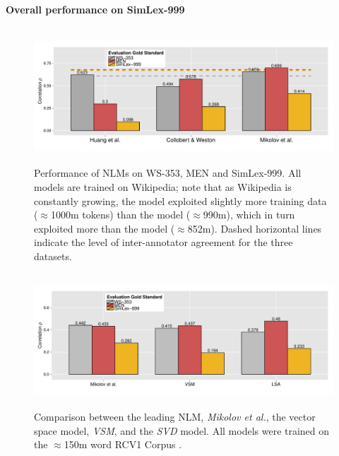 \documentclass[fullname]{clv2}
\begin{document}
\paragraph{\bf Overall performance on SimLex-999}

\begin{figure}[ht]  \includegraphics[width = \textwidth, height=5cm]{Figure_2A_CL} \caption{Performance of NLMs on WS-353, MEN and SimLex-999. All models are trained on Wikipedia; note that as Wikipedia is constantly growing, the \protect{} model exploited slightly more training data ($\approx$1000m tokens) than the \protect{} model ($\approx$990m), which in turn exploited more than the \protect{} model ($\approx$852m). Dashed horizontal lines indicate the level of inter-annotator agreement for the three datasets.}\end{figure}

\begin{figure}[ht]  \includegraphics[width = \textwidth,height=5cm]{Figure_2B_CL}  \caption{Comparison between the leading NLM, \emph{Mikolov et al.}, the vector space model, \emph{VSM}, and the \emph{SVD} model. All models were trained on the $\approx$150m word RCV1 Corpus \protect\cite{lewis2004rcv1}.}\end{figure}
\end{document}
